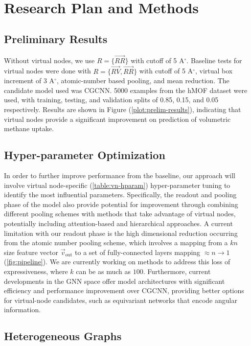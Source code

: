 \documentclass{lxaiproposal}
\begin{document}
\section*{Research Plan and Methods}

\subsection*{Preliminary Results}

Without virtual nodes, we use $R=\{\vec{RR}\}$ with cutoff of 5 A$^\circ$.
Baseline tests for virtual nodes were done with $R=\{\vec{RV},\vec{RR}\}$ with cutoff of 5 A$^\circ$, virtual box increment of 3 A$^\circ$, atomic-number based pooling, and mean reduction. The candidate model used was CGCNN. 5000 examples from the hMOF dataset were used, with training, testing, and validation splits of 0.85, 0.15, and 0.05 respectively. Results are shown in Figure (\ref{plot:prelim-results}), indicating that virtual nodes provide a significant improvement on prediction of volumetric methane uptake.

\subsection*{Hyper-parameter Optimization}

In order to further improve performance from the baseline, our approach will involve virtual node-specific (\ref{table:vn-hparam}) hyper-parameter tuning to identify the most influential parameters.
Specifically, the readout and pooling phase of the model also provide potential for improvement through combining different pooling schemes with methods that take advantage of virtual nodes, potentially including attention-based and hierarchical approaches\cite{zhang2019hierarchical}. A current limitation with our readout phase is the high dimensional reduction occurring from the atomic number pooling scheme, which involves a mapping from a $kn$ size feature vector $\vec v_\text{out}$ to a set of fully-connected layers mapping $\approx n\to 1$ (\ref{fig:pipeline}). We are currently working on methods to address this loss of expressiveness, where $k$ can be as much as $100$. Furthermore, current developments in the GNN space offer model architectures with significant efficiency and performance improvement over CGCNN, providing better options for virtual-node candidates, such as equivariant networks that encode angular information\cite{jorgensen2022equivariant}.

\subsection*{Heterogeneous Graphs}
\end{document}
